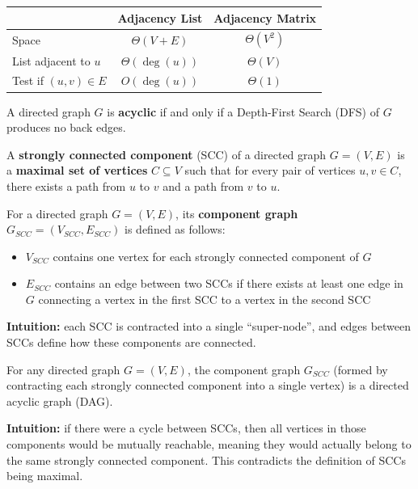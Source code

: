 \documentclass[11pt,a4paper,openany]{book}
\begin{document}
\begin{table}[h]
\centering
\begin{tabular}{|l|c|c|}
\hline
 & \textbf{Adjacency List} & \textbf{Adjacency Matrix} \\
\hline
Space & $\Theta(V + E)$ & $\Theta(V^2)$ \\
\hline
List adjacent to $u$ & $\Theta(\deg(u))$ & $\Theta(V)$ \\
\hline
Test if $(u,v) \in E$ & $O(\deg(u))$ & $\Theta(1)$ \\
\hline
\end{tabular}
\end{table}


\begin{defnbox}[title=Cycle Detection Lemma]
A directed graph $G$ is \textbf{acyclic} if and only if a Depth-First Search (DFS) of $G$ produces no back edges.
\end{defnbox}


\begin{defnbox}[title=Strongly Connected Component (SCC)]
A \textbf{strongly connected component} (SCC) of a directed graph $G = (V, E)$ is a \textbf{maximal set of vertices} $C \subseteq V$ such that for every pair of vertices $u, v \in C$, there exists a path from $u$ to $v$ and a path from $v$ to $u$.
\end{defnbox}

\begin{defnbox}[title=Component Graph (SCC Graph)]
For a directed graph $G = (V, E)$, its \textbf{component graph} $G_{SCC} = (V_{SCC}, E_{SCC})$ is defined as follows:

\begin{itemize}
    \item $V_{SCC}$ contains one vertex for each strongly connected component of $G$
    \item $E_{SCC}$ contains an edge between two SCCs if there exists at least one edge in $G$ connecting a vertex in the first SCC to a vertex in the second SCC
\end{itemize}

\textbf{Intuition:} each SCC is contracted into a single “super-node”, and edges between SCCs define how these components are connected.
\end{defnbox}


\begin{defnbox}[title=Lemma: The SCC Graph is a DAG (Directed acyclic graph)]
For any directed graph $G = (V, E)$, the component graph $G_{SCC}$ (formed by contracting each strongly connected component into a single vertex) is a directed acyclic graph (DAG).

\medskip

\textbf{Intuition:} if there were a cycle between SCCs, then all vertices in those components would be mutually reachable, meaning they would actually belong to the same strongly connected component. This contradicts the definition of SCCs being maximal.
\end{defnbox}
\end{document}
